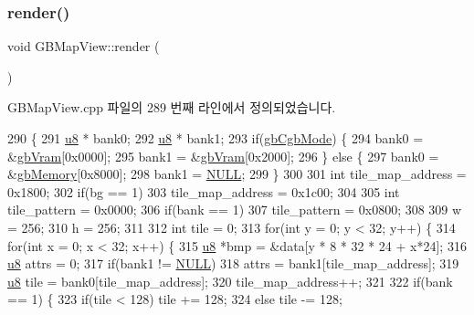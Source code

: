 \subsubsection{\texorpdfstring{render()}{render()}}
{\footnotesize\ttfamily void G\+B\+Map\+View\+::render (\begin{DoxyParamCaption}{ }\end{DoxyParamCaption})}



G\+B\+Map\+View.\+cpp 파일의 289 번째 라인에서 정의되었습니다.


\begin{DoxyCode}
290 \{
291   \mbox{\hyperlink{_system_8h_aed742c436da53c1080638ce6ef7d13de}{u8}} * bank0;
292   \mbox{\hyperlink{_system_8h_aed742c436da53c1080638ce6ef7d13de}{u8}} * bank1;
293   \textcolor{keywordflow}{if}(\mbox{\hyperlink{gb_globals_8cpp_aa3e3449c9ba4db2eeb687d6facfca761}{gbCgbMode}}) \{
294     bank0 = &\mbox{\hyperlink{gb_globals_8cpp_acc4cae98f0f9473610870333741081e9}{gbVram}}[0x0000];
295     bank1 = &\mbox{\hyperlink{gb_globals_8cpp_acc4cae98f0f9473610870333741081e9}{gbVram}}[0x2000];
296   \} \textcolor{keywordflow}{else} \{
297     bank0 = &\mbox{\hyperlink{gb_globals_8cpp_a43f07d3a5fcb2301e2662188e888c5a1}{gbMemory}}[0x8000];
298     bank1 = \mbox{\hyperlink{getopt1_8c_a070d2ce7b6bb7e5c05602aa8c308d0c4}{NULL}};
299   \}
300 
301   \textcolor{keywordtype}{int} tile\_map\_address = 0x1800;
302   \textcolor{keywordflow}{if}(bg == 1)
303     tile\_map\_address = 0x1c00;
304 
305   \textcolor{keywordtype}{int} tile\_pattern = 0x0000;
306   \textcolor{keywordflow}{if}(bank == 1)
307     tile\_pattern = 0x0800;
308   
309   w = 256;
310   h = 256;
311   
312   \textcolor{keywordtype}{int} tile = 0;
313   \textcolor{keywordflow}{for}(\textcolor{keywordtype}{int} y = 0; y < 32; y++) \{
314     \textcolor{keywordflow}{for}(\textcolor{keywordtype}{int} x = 0; x < 32; x++) \{
315       \mbox{\hyperlink{_system_8h_aed742c436da53c1080638ce6ef7d13de}{u8}} *bmp = &data[y * 8 * 32 * 24 + x*24];      
316       \mbox{\hyperlink{_system_8h_aed742c436da53c1080638ce6ef7d13de}{u8}} attrs = 0;
317       \textcolor{keywordflow}{if}(bank1 != \mbox{\hyperlink{getopt1_8c_a070d2ce7b6bb7e5c05602aa8c308d0c4}{NULL}})
318         attrs = bank1[tile\_map\_address];
319       \mbox{\hyperlink{_system_8h_aed742c436da53c1080638ce6ef7d13de}{u8}} tile = bank0[tile\_map\_address];
320       tile\_map\_address++;
321 
322       \textcolor{keywordflow}{if}(bank == 1) \{
323         \textcolor{keywordflow}{if}(tile < 128) tile += 128;
324         \textcolor{keywordflow}{else} tile -= 128;

\end{DoxyCode}
